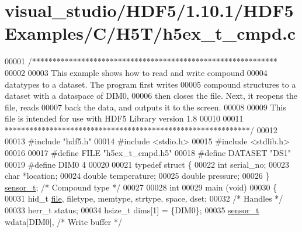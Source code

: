 \hypertarget{visual__studio_2_h_d_f5_21_810_81_2_h_d_f5_examples_2_c_2_h5_t_2h5ex__t__cmpd_8c_source}{}\section{visual\+\_\+studio/\+H\+D\+F5/1.10.1/\+H\+D\+F5\+Examples/\+C/\+H5\+T/h5ex\+\_\+t\+\_\+cmpd.c}
\label{visual__studio_2_h_d_f5_21_810_81_2_h_d_f5_examples_2_c_2_h5_t_2h5ex__t__cmpd_8c_source}

\begin{DoxyCode}
00001 \textcolor{comment}{/************************************************************}
00002 \textcolor{comment}{}
00003 \textcolor{comment}{  This example shows how to read and write compound}
00004 \textcolor{comment}{  datatypes to a dataset.  The program first writes}
00005 \textcolor{comment}{  compound structures to a dataset with a dataspace of DIM0,}
00006 \textcolor{comment}{  then closes the file.  Next, it reopens the file, reads}
00007 \textcolor{comment}{  back the data, and outputs it to the screen.}
00008 \textcolor{comment}{}
00009 \textcolor{comment}{  This file is intended for use with HDF5 Library version 1.8}
00010 \textcolor{comment}{}
00011 \textcolor{comment}{ ************************************************************/}
00012 
00013 \textcolor{preprocessor}{#include "hdf5.h"}
00014 \textcolor{preprocessor}{#include <stdio.h>}
00015 \textcolor{preprocessor}{#include <stdlib.h>}
00016 
00017 \textcolor{preprocessor}{#define FILE            "h5ex\_t\_cmpd.h5"}
00018 \textcolor{preprocessor}{#define DATASET         "DS1"}
00019 \textcolor{preprocessor}{#define DIM0            4}
00020 
00021 \textcolor{keyword}{typedef} \textcolor{keyword}{struct }\{
00022     \textcolor{keywordtype}{int}     serial\_no;
00023     \textcolor{keywordtype}{char}    *location;
00024     \textcolor{keywordtype}{double}  temperature;
00025     \textcolor{keywordtype}{double}  pressure;
00026 \} \hyperlink{structsensor__t}{sensor\_t};                                 \textcolor{comment}{/* Compound type */}
00027 
00028 \textcolor{keywordtype}{int}
00029 main (\textcolor{keywordtype}{void})
00030 \{
00031     hid\_t       \hyperlink{structfile}{file}, filetype, memtype, strtype, space, dset;
00032                                             \textcolor{comment}{/* Handles */}
00033     herr\_t      status;
00034     hsize\_t     dims[1] = \{DIM0\};
00035     \hyperlink{structsensor__t}{sensor\_t}    wdata[DIM0],                \textcolor{comment}{/* Write buffer */}

\end{DoxyCode}
